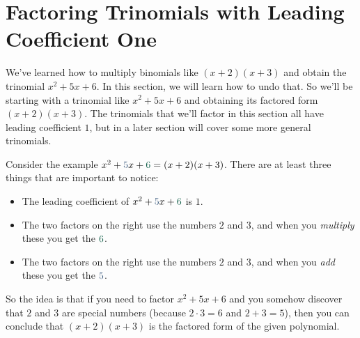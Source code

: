 \documentclass{ximera}
\begin{document}
\section{Factoring Trinomials with Leading Coefficient One}
  We've learned how to multiply binomials like
      $(x+2)(x+3)$ and obtain the trinomial $x^2+5x+6$.
      In this section, we will learn how to undo that.
      So we'll be starting with a trinomial like
      $x^2+5x+6$ and obtaining its factored form $(x+2)(x+3)$.
      The trinomials that we'll factor in this section all have leading coefficient $1$,
      but in a later section
      will cover some more general trinomials.
\begin{example}
      Consider the example $x^2+\firsthighlight{5}x+\secondhighlight{6}=(x+2)(x+3)$.
      There are at least three things that are important to notice:
\begin{itemize}
\item The leading coefficient of $x^2+\firsthighlight{5}x+\secondhighlight{6}$ is $1$.

   \item  The two factors on the right use the numbers $2$ and $3$,
            and when you \textit{multiply} these you get the $\secondhighlight{6}$.

            \item The two factors on the right use the numbers $2$ and $3$,
            and when you \textit{add} these you get the $\firsthighlight{5}$.
\end{itemize}
     So the idea is that if you need to factor
      $x^2+5x+6$ and you somehow discover that $2$ and $3$ are special numbers
      (because $2\cdot3=6$ and $2+3=5$),
      then you can conclude that
      $(x+2)(x+3)$ is the factored form of the given polynomial.


\end{example}
\end{document}
